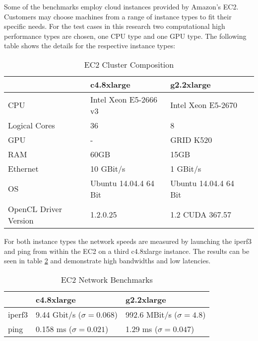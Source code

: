Some of the benchmarks employ cloud instances provided by Amazon's EC2. Customers may choose machines from a range of instance types to fit their specific needs. For the test cases in this research two computational high performance types are chosen, one CPU type and one GPU type. The following table shows the details for the respective instance types:

\begin{table}[!htb]
	\centering
	\begin{adjustbox}{width=0.65\textwidth}
		\small
		\begin{tabular}{l | l | l | l}
			~                     & c4.8xlarge                	& g2.2xlarge                 \\
			\hline
			CPU                   &  Intel Xeon E5-2666 v3 	& Intel Xeon E5-2670 \\
			Logical Cores         &  36 	& 8 \\
			GPU                   &  -						& GRID K520 \\
			RAM                   &  60GB                       	& 15GB                       \\
			Ethernet          &  10 GBit/s                  	& 1 GBit/s                  \\
			OS                    &  Ubuntu 14.04.4 64 Bit      	& Ubuntu 14.04.4 64 Bit      \\
			OpenCL Driver Version &  1.2.0.25                   & 1.2 CUDA 367.57        \\
		\end{tabular}
	\end{adjustbox}
	
	\caption{EC2 Cluster Composition}
	\label{table:cluster_setup_ec2}
\end{table}

For both instance types the network speeds are measured by launching the iperf3 and ping from within the EC2 on a third c4.8xlarge instance. The results can be seen in table \ref{table:cluster_interconnect_benchmarks} and demonstrate high bandwidths and low latencies.

\begin{table}[!htb]
	\centering
	\begin{adjustbox}{width=0.5\textwidth}
		\small
		\begin{tabular}{l | l | l}
			~                     & c4.8xlarge               			& g2.2xlarge                \\
			\hline
			iperf3                & 9.44 Gbit/s ($\sigma = 0.068$) 	& 992.6 MBit/s ($\sigma = 4.8$) \\
			ping                  & 0.158 ms ($\sigma = 0.021$)  		& 1.29 ms ($\sigma = 0.047$)  \\
		\end{tabular}
	\end{adjustbox}
	
	\caption{EC2 Network Benchmarks}
	\label{table:cluster_interconnect_benchmarks}
\end{table}


